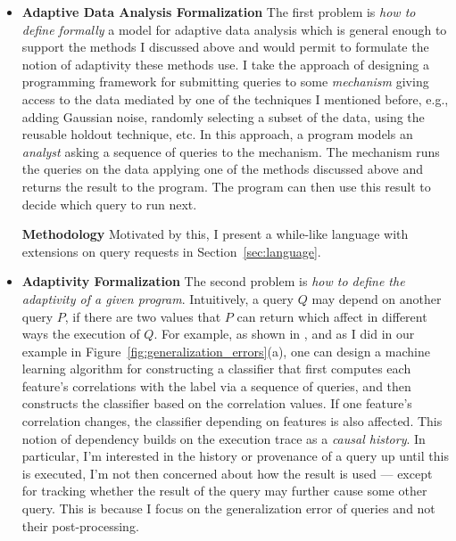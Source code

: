 \begin{itemize}
 \item
 \textbf{Adaptive Data Analysis Formalization}
The first problem is \emph{how to define formally} a model for adaptive data analysis which is general enough to support the methods I discussed above and would permit to formulate the notion of adaptivity these methods use. 
I take the approach of designing a programming framework for submitting queries to some \emph{mechanism} giving access to the data mediated by one of the techniques I mentioned before, e.g., adding Gaussian noise, randomly selecting a subset of the data, using the reusable holdout technique, etc. 
In this approach, a program models an \emph{analyst} asking a sequence of queries to the mechanism. The mechanism runs the queries on the data applying one of the methods discussed above and returns the result to the program. The program can then use this result to decide which query to run next. 

\textbf{Methodology}
Motivated by this, I present a while-like language with extensions on query requests in Section~\ref{sec:language}.

\item 
\textbf{Adaptivity Formalization}
The second problem is \emph{how to define the adaptivity of a given program}.
Intuitively, a query $Q$ may depend on another query $P$, if there are two values that $P$ can return which affect in different ways the execution of $Q$. 
For example, as shown in \cite{dwork2015reusable}, and as I did in our example in Figure~\ref{fig:generalization_errors}(a), one can design a machine learning algorithm for constructing a classifier that first computes each feature's correlations with the label via a sequence of queries, and then constructs the classifier based on the correlation values. 
If one feature's correlation changes, the classifier depending on features is also affected. 
This notion of dependency builds on the execution trace as a \emph{causal history}. 
In particular, I'm interested in the history or provenance of a query up until this is executed, I'm not then concerned about how the result is used --- except for tracking whether the result of the query may further cause some other query. 
This is because I focus on the generalization error of queries and not their post-processing. %


\end{itemize}
